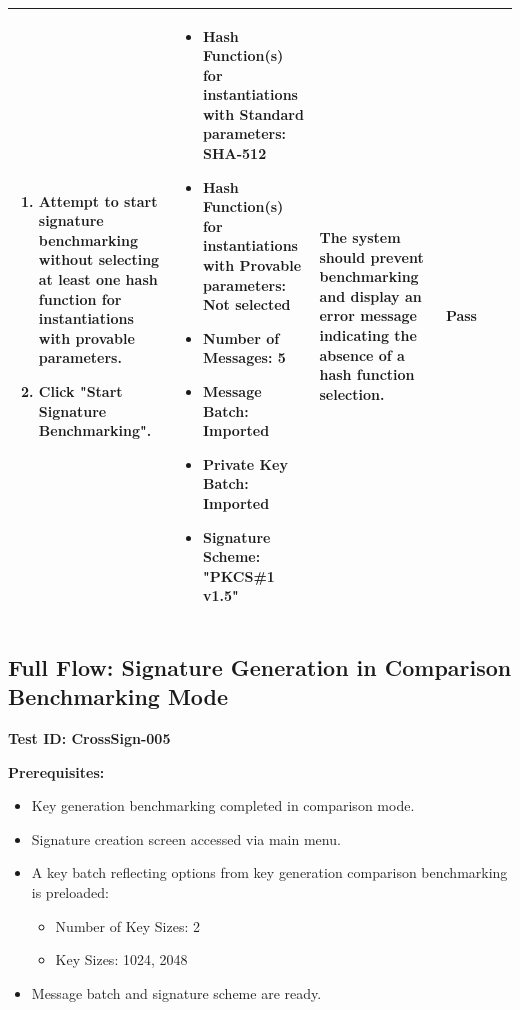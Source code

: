 \documentclass[]{final_report}
\theoremstyle{definition}
\begin{document}
\begin{longtable}{|p{1.5cm}|p{2.5cm}|p{3.5cm}|p{2.5cm}|p{3cm}|p{2cm}|}
  \begin{enumerate}
    \item Attempt to start signature benchmarking without selecting at least one hash function for instantiations with provable parameters.
    \item Click "Start Signature Benchmarking".
  \end{enumerate} & 
  \begin{itemize}
    \item Hash Function(s) for instantiations with Standard parameters: SHA-512
     \item Hash Function(s) for instantiations with Provable parameters: Not selected
    \item Number of Messages: 5
    \item Message Batch: Imported
    \item Private Key Batch: Imported
    \item Signature Scheme: "PKCS\#1 v1.5" 
  \end{itemize} &
  The system should prevent benchmarking and display an error message indicating the absence of a hash function selection. & Pass \\
  \hline
\end{longtable}



\subsection*{Full Flow: Signature Generation in Comparison Benchmarking Mode}

\textbf{Test ID: CrossSign-005}

\textbf{Prerequisites:}
\begin{itemize}
    \item Key generation benchmarking completed in comparison mode.
    \item Signature creation screen accessed via main menu.
    \item A key batch reflecting options from key generation comparison benchmarking is preloaded:
    \begin{itemize}
        \item Number of Key Sizes: 2
        \item Key Sizes: 1024, 2048
    \end{itemize}
    \item Message batch and signature scheme are ready.
\end{itemize}
\end{document}
